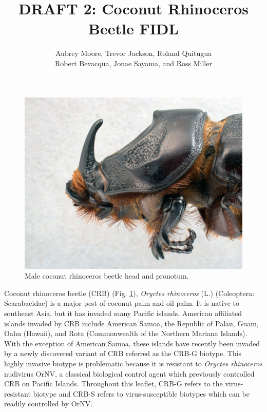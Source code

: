 \documentclass[twocolumn,letterpaper]{scrartcl}
\begin{document}
\title{DRAFT 2: Coconut Rhinoceros Beetle FIDL}
\author{Aubrey Moore, Trevor Jackson, Roland Quitugua\\ Robert Bevacqua, Jonae Sayama, and Ross Miller}
\maketitle


\newpage

\begin{figure}[h]
	\centering
	\includegraphics[width=\linewidth]{images/rhino_beetle_head}
	\caption{Male coconut rhinoceros beetle head and pronotum.}
	\label{fig:rhinobeetlehead}
\end{figure}

Coconut rhinoceros beetle (CRB) (Fig. \ref{fig:rhinobeetlehead}), \textit{Oryctes rhinoceros} (L.) (Coleoptera: Scarabaeidae) is a major pest of coconut palm and oil palm. It is native to southeast Asia, but it has invaded many Pacific islands. American affiliated islands invaded by CRB include American Samoa, the Republic of Palau, Guam, Oahu (Hawaii), and Rota (Commonwealth of the Northern Mariana Islands). With the exception of American Samoa, these islands have recently been invaded by a newly discovered variant of CRB referred as the CRB-G biotype. This highly invasive biotype is problematic because it is resistant to \textit{Oryctes rhinoceros} nudivirus OrNV, a classical biological control agent which previously controlled CRB on Pacific Islands. Throughout this leaflet, CRB-G refers to the virus-resistant biotype and CRB-S refers to virus-susceptible biotypes which can be readily controlled by OrNV.
\end{document}
